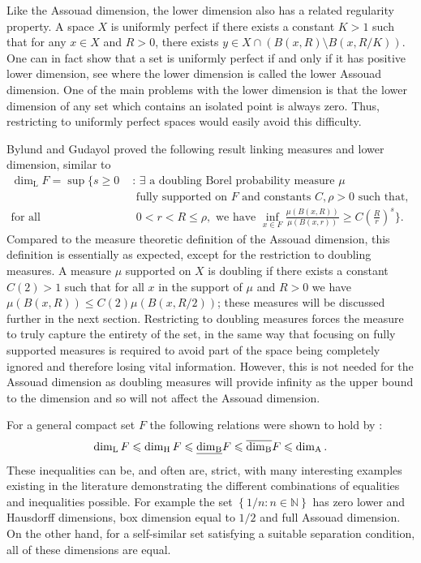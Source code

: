 Like the Assouad dimension, the lower dimension also has a related regularity property. A space $X$ is uniformly perfect if there exists a constant $K > 1$ such that for any $x \in X$ and $R > 0$, there exists $y \in X \cap \left(B(x, R) \setminus B(x, R/K)\right)$. One can in fact show that a set is uniformly perfect if and only if it has positive lower dimension, see \cite[Lemma 2.1]{anti1} where the lower dimension is called the lower Assouad dimension. One of the main problems with the lower dimension is that the lower dimension of any set which contains an isolated point is always zero. Thus, restricting to uniformly perfect spaces would easily avoid this difficulty. 

Bylund and Gudayol \cite{bylund} proved the following result linking measures and lower dimension, similar to \cite{luksak, konyagin}
\begin{align*}
\dim_{\text{L}} F = \sup \Bigg\{ s \geq 0 \, \,  &: \, \exists \text{ a doubling Borel probability measure } \mu  \\  &\text{ fully supported on }F \text{ and constants }C, \rho > 0  \text{ such that, } \\ \text{for all } &\, \, 0< r< R \leq \rho, \text{ we have  }\inf_{x\in F} \frac{\mu(B(x,R))}{\mu(B(x,r))} \geq C\left(\frac{R}{r}\right)^{s} \Bigg\}.
\end{align*}
Compared to the measure theoretic definition of the Assouad dimension, this definition is essentially as expected, except for the restriction to doubling measures. A measure $\mu$ supported on $X$ is doubling if there exists a constant $C(2) > 1$ such that for all $x$ in the support of $\mu$ and $R > 0$ we have $\mu( B(x,R)) \le C(2) \mu(B(x,R/2))$; these measures will be discussed further in the next section. Restricting to doubling measures forces the measure to truly capture the entirety of the set, in the same way that focusing on fully supported measures is required to avoid part of the space being completely ignored and therefore losing vital information. However, this is not needed for the Assouad dimension as doubling measures will provide infinity as the upper bound to the dimension and so will not affect the Assouad dimension. 


For a general compact set $F$ the following relations were shown to hold by \cite{fraser, larman1, larman2}:
\[
\dim_{\textup{L}} F \leqslant \dim_{\text{H}} F \leqslant \underline{\dim_{\textup{B}}} F \leqslant \overline{\dim_{\textup{B}}} F \leqslant \dim_{\textup{A}}.
\]
These inequalities can be, and often are, strict, with many interesting examples existing in the literature demonstrating the different combinations of equalities and inequalities possible. For example the set $\left\{1/n \colon n \in \mathbb{N} \right\}$ has zero lower and Hausdorff dimensions, box dimension equal to $1/2$ and full Assouad dimension. On the other hand, for a self-similar set satisfying a suitable separation condition, all of these dimensions are equal. 







